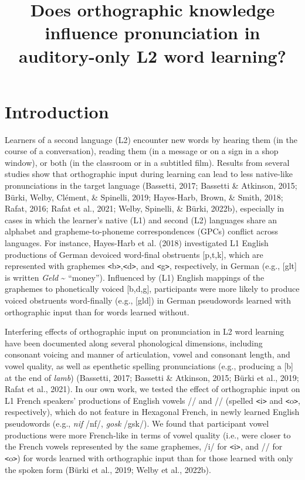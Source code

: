 \documentclass[
  english,
  man,floatsintext]{apa7}
\title{Does orthographic knowledge influence pronunciation in auditory-only L2 word learning?}
\author{\phantom{0}}
\date{}
\affiliation{\phantom{0}}
\begin{document}
\maketitle

\section{Introduction}\label{introduction}

Learners of a second language (L2) encounter new words by hearing them (in the course of a conversation), reading them (in a message or on a sign in a shop window), or both (in the classroom or in a subtitled film). Results from several studies show that orthographic input during learning can lead to less native-like pronunciations in the target language (Bassetti, 2017; Bassetti \& Atkinson, 2015; Bürki, Welby, Clément, \& Spinelli, 2019; Hayes-Harb, Brown, \& Smith, 2018; Rafat, 2016; Rafat et al., 2021; Welby, Spinelli, \& Bürki, 2022b), especially in cases in which the learner's native (L1) and second (L2) languages share an alphabet and grapheme-to-phoneme correspondences (GPCs) conflict across languages. For instance, Hayes-Harb et al. (2018) investigated L1 English productions of German devoiced word-final obstruents {[}p,t,k{]}, which are represented with graphemes \texttt{\textless{}}b\texttt{\textgreater{}},\texttt{\textless{}}d\texttt{\textgreater{}}, and \texttt{\textless{}}g\texttt{\textgreater{}}, respectively, in German (e.g., {[}g\textepsilon lt{]} is written \emph{Geld} \textasciitilde{} ``money''). Influenced by (L1) English mappings of the graphemes to phonetically voiced {[}b,d,g{]}, participants were more likely to produce voiced obstruents word-finally (e.g., {[}g\textepsilon ld{]}) in German pseudowords learned with orthographic input than for words learned without.

Interfering effects of orthographic input on pronunciation in L2 word learning have been documented along several phonological dimensions, including consonant voicing and manner of articulation, vowel and consonant length, and vowel quality, as well as epenthetic spelling pronunciations (e.g., producing a {[}b{]} at the end of \emph{lamb}) (Bassetti, 2017; Bassetti \& Atkinson, 2015; Bürki et al., 2019; Rafat et al., 2021). In our own work, we tested the effect of orthographic input on L1 French speakers' productions of English vowels /\textsci / and /\textscripta / (spelled \texttt{\textless{}}i\texttt{\textgreater{}} and \texttt{\textless{}}o\texttt{\textgreater{}}, respectively), which do not feature in Hexagonal French, in newly learned English pseudowords (e.g., \emph{nif} /n\textsci f/, \emph{gosk} /g\textscripta sk/). We found that participant vowel productions were more French-like in terms of vowel quality (i.e., were closer to the French vowels represented by the same graphemes, /i/ for \texttt{\textless{}}i\texttt{\textgreater{}}, and /\textopeno / for \texttt{\textless{}}o\texttt{\textgreater{}}) for words learned with orthographic input than for those learned with only the spoken form (Bürki et al., 2019; Welby et al., 2022b).
\end{document}
